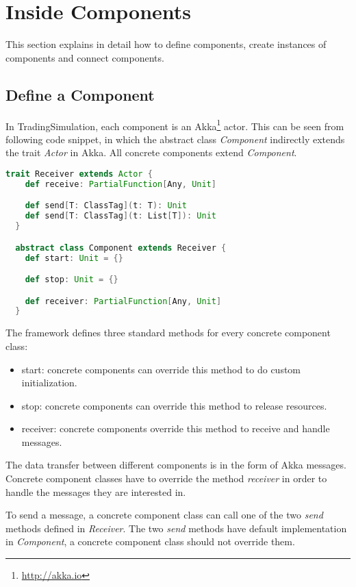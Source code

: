 
\section{Inside Components}
\label{sec:2}

This section explains in detail how to define components, create instances of components and connect components.

\subsection{Define a Component}

In TradingSimulation, each component is an Akka\footnote{\url{http://akka.io}} actor. This can be seen from following code snippet, in which the abstract class \emph{Component} indirectly extends the trait \emph{Actor} in Akka. All concrete components extend \emph{Component}.

\begin{lstlisting}[language=Scala]
  trait Receiver extends Actor {
    def receive: PartialFunction[Any, Unit]

    def send[T: ClassTag](t: T): Unit
    def send[T: ClassTag](t: List[T]): Unit
  }

  abstract class Component extends Receiver {
    def start: Unit = {}

    def stop: Unit = {}

    def receiver: PartialFunction[Any, Unit]
  }
\end{lstlisting}

The framework defines three standard methods for every concrete component class:

\begin{itemize}
\item{start}: concrete components can override this method to do custom initialization.
\item{stop}: concrete components can override this method to release resources.
\item{receiver}: concrete components override this method to receive and handle messages.
\end{itemize}

The data transfer between different components is in the form of Akka messages. Concrete component classes have to override the method \emph{receiver} in order to handle the messages they are interested in.

To send a message, a concrete component class can call one of the two \emph{send} methods defined in \emph{Receiver}. The two \emph{send} methods have default implementation in \emph{Component}, a concrete component class should not override them.

